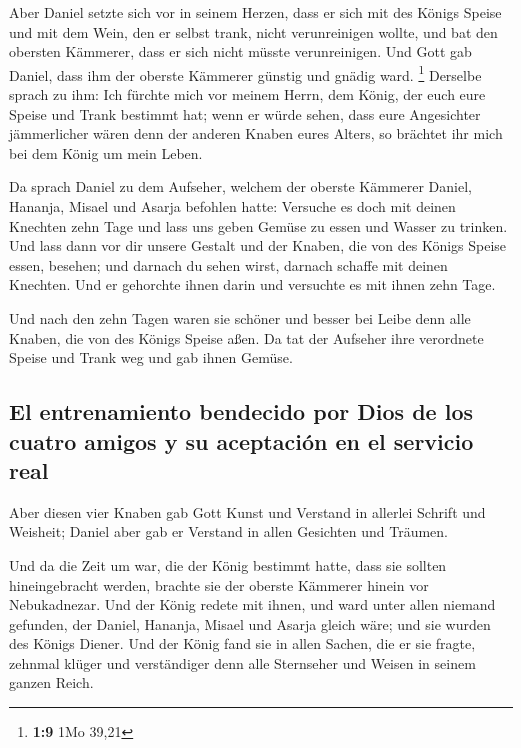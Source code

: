  Aber Daniel setzte sich vor in seinem Herzen, dass er
sich mit des Königs Speise und mit dem Wein, den er selbst trank, nicht
verunreinigen wollte, und bat den obersten Kämmerer, dass er sich nicht
müsste verunreinigen.  Und Gott gab Daniel, dass ihm der
oberste Kämmerer günstig und gnädig ward. \footnote{\textbf{1:9} 1Mo
  39,21}  Derselbe sprach zu ihm: Ich fürchte mich vor
meinem Herrn, dem König, der euch eure Speise und Trank bestimmt hat;
wenn er würde sehen, dass eure Angesichter jämmerlicher wären denn der
anderen Knaben eures Alters, so brächtet ihr mich bei dem König um mein
Leben.

 Da sprach Daniel zu dem Aufseher, welchem der oberste
Kämmerer Daniel, Hananja, Misael und Asarja befohlen hatte:
 Versuche es doch mit deinen Knechten zehn Tage und lass
uns geben Gemüse zu essen und Wasser zu trinken.  Und
lass dann vor dir unsere Gestalt und der Knaben, die von des Königs
Speise essen, besehen; und darnach du sehen wirst, darnach schaffe mit
deinen Knechten.  Und er gehorchte ihnen darin und
versuchte es mit ihnen zehn Tage.

 Und nach den zehn Tagen waren sie schöner und besser bei
Leibe denn alle Knaben, die von des Königs Speise aßen. 
Da tat der Aufseher ihre verordnete Speise und Trank weg und gab ihnen
Gemüse.

\hypertarget{el-entrenamiento-bendecido-por-dios-de-los-cuatro-amigos-y-su-aceptaciuxf3n-en-el-servicio-real}{%
\subsection{El entrenamiento bendecido por Dios de los cuatro amigos y
su aceptación en el servicio
real}\label{el-entrenamiento-bendecido-por-dios-de-los-cuatro-amigos-y-su-aceptaciuxf3n-en-el-servicio-real}}

 Aber diesen vier Knaben gab Gott Kunst und Verstand in
allerlei Schrift und Weisheit; Daniel aber gab er Verstand in allen
Gesichten und Träumen.

 Und da die Zeit um war, die der König bestimmt hatte,
dass sie sollten hineingebracht werden, brachte sie der oberste Kämmerer
hinein vor Nebukadnezar.  Und der König redete mit ihnen,
und ward unter allen niemand gefunden, der Daniel, Hananja, Misael und
Asarja gleich wäre; und sie wurden des Königs Diener. 
Und der König fand sie in allen Sachen, die er sie fragte, zehnmal
klüger und verständiger denn alle Sternseher und Weisen in seinem ganzen
Reich.

